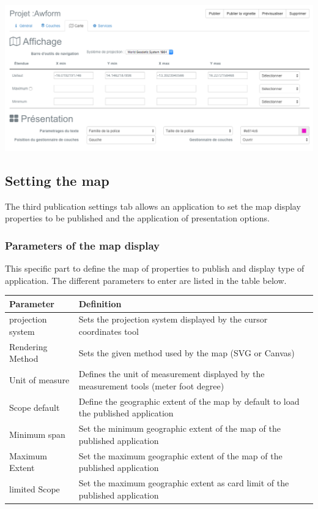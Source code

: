 \documentclass[letterpaper,10pt,english]{sphinxmanual}
\begin{document}
\includegraphics[width=1.000\linewidth]{publisher-map-conf.png}


\subsection{Setting the map}
\label{apps/appconfig:parametrage-de-la-carte}
The third publication settings tab allows an application to set the map display properties to be published and the application of presentation options.


\subsubsection{Parameters of the map display}
\label{apps/appconfig:parametres-de-l-affichage-de-la-carte}
This specific part to define the map of properties to publish and display type of application. The different parameters to enter are listed in the table below.

\begin{tabulary}{\linewidth}{|L|L|}
\hline

\textbf{Parameter}
 & 
\textbf{Definition}
\\
\hline
projection system
 & 
Sets the projection system displayed by the cursor coordinates tool
\\
\hline
Rendering Method
 & 
Sets the given method used by the map (SVG or Canvas)
\\
\hline
Unit of measure
 & 
Defines the unit of measurement displayed by the measurement tools (meter \textbar{} foot \textbar{} degree)
\\
\hline
Scope default
 & 
Define the geographic extent of the map by default to load the published application
\\
\hline
Minimum span
 & 
Set the minimum geographic extent of the map of the published application
\\
\hline
Maximum Extent
 & 
Set the maximum geographic extent of the map of the published application
\\
\hline
limited Scope
 & 
Set the maximum geographic extent as card limit of the published application
\\
\hline\end{tabulary}
\end{document}
